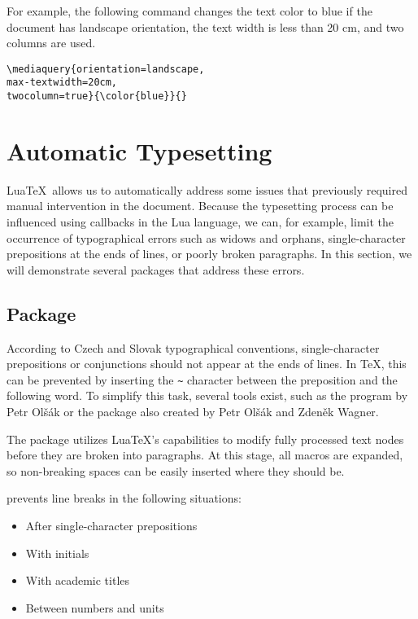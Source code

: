 \documentclass{ltugboat}
\begin{document}
For example, the following command changes the text color to blue if the
document has landscape orientation, the text width is less than 20 cm, and two
columns are used.

\begin{verbatim}
\mediaquery{orientation=landscape,
max-textwidth=20cm,
twocolumn=true}{\color{blue}}{}
\end{verbatim}


\section{Automatic Typesetting}

Lua\TeX\ allows us to automatically address some issues that previously
required manual intervention in the document. Because the typesetting process
can be influenced using callbacks in the Lua language, we can, for example,
limit the occurrence of typographical errors such as widows and orphans,
single-character prepositions at the ends of lines, or poorly broken
paragraphs. In this section, we will demonstrate several packages that address
these errors.

\subsection{ Package}

According to Czech and Slovak typographical conventions, single-character
prepositions or conjunctions should not appear at the ends of lines. In \TeX,
this can be prevented by inserting the \verb|~| character between the
preposition and the following word. To simplify this task, several tools exist,
such as the  program by Petr Olšák or the 
package also created by Petr Olšák and Zdeněk Wagner.

The  package \cite{luavlna} utilizes Lua\TeX's capabilities to
modify fully processed text nodes before they are broken into paragraphs. At
this stage, all macros are expanded, so non-breaking spaces can be easily
inserted where they should be.

 prevents line breaks in the following situations:

\begin{itemize}
  \item After single-character prepositions
  \item With initials
  \item With academic titles
  \item Between numbers and units
\end{itemize}
\end{document}
